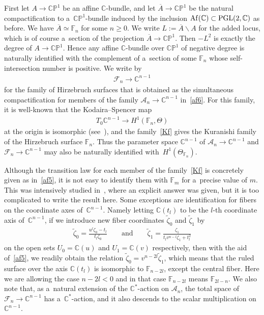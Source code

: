 First let $A\to \mathbb{CP}^1$ be an af\/f\/ine $\mathbb{C}$-bundle, and let $\overline A\to \mathbb{CP}^1$ be the
natural compactif\/ication to a~$\mathbb{CP}^1$-bundle induced by the inclusion ${\rm Af}(\mathbb{C})\subset
\mathrm{PGL}(2,\mathbb{C})$ as before.
We have $\overline A\simeq \mathbb{F}_n$ for some $n\ge 0$.
We write $L:= \overline A\backslash A$ for the added locus, which is of course a~section of the projection $\overline A\to \mathbb{CP}^1$.
Then $-L^2$ is exactly the degree of $A\to \mathbb{CP}^1$.
Hence any af\/f\/ine $\mathbb{C}$-bundle over $\mathbb{CP}^1$ of negative degree is naturally identif\/ied with the
complement of a~section of some $\mathbb{F}_n$ whose self-intersection number is positive.
We write by
\begin{gather}
\label{Kf}
\mathscr F_n\to \mathbb{C}^{n-1}
\end{gather}
for the family of Hirzebruch surfaces that is obtained as the simultaneous compactif\/ication for members of the family
$\mathscr A_n\to \mathbb{C}^{n-1}$ in~\eqref{af6}.
For this family, it is well-known that the Kodaira--Spencer map
\begin{gather}
\label{ks001}
T_0\mathbb{C}^{n-1}\to H^1(\mathbb{F}_n,\Theta)
\end{gather}
at the origin is isomorphic (see~\cite[pp.~309--312]{K}), and the family~\eqref{Kf} gives the Kuranishi family of the
Hirzebruch surface $\mathbb{F}_n$.
Thus the parameter space $\mathbb{C}^{n-1}$ of $\mathscr A_n\to\mathbb{C}^{n-1}$ and $\mathscr F_n\to\mathbb{C}^{n-1}$
may also be naturally identif\/ied with~$H^1(\Theta_{\mathbb{F}_n})$.

Although the transition law for each member of the family~\eqref{Kf} is concretely given as in~\eqref{af5}, it is not
easy to identify them with $\mathbb{F}_m$ for a~precise value of $m$.
This was intensively studied in~\cite[p.~143, Theorem]{Suwa}, where an explicit answer was given, but it is too
complicated to write the result here.
Some exceptions are identif\/ication for f\/ibers on the coordinate axes of~$\mathbb{C}^{n-1}$.
Namely letting $\mathbb{C}(t_l)$ to be the $l$-th coordinate axis of~$\mathbb{C}^{n-1}$, if we introduce new f\/iber
coordinates $\tilde{\zeta}_0$ and $\tilde{\zeta}_1$ by
\begin{gather}
\label{zeta'}
\tilde{\zeta}_0 = \frac{u^l\zeta_0-t_l}{t_l\zeta_0}
\qquad
\text{and}
\qquad
\tilde{\zeta}_1= \frac{\zeta_1}{t_lv^{n-l}\zeta_1 + t_l^2}
\end{gather}
on the open sets $U_0=\mathbb{C}(u)$ and $U_1=\mathbb{C}(v)$ respectively, then with the aid of~\eqref{af5}, we readily
obtain the relation $\tilde{\zeta}_0 = v^{n-2l}\tilde{\zeta}_1$, which means that the ruled surface over the axis
$\mathbb{C}(t_l)$ is isomorphic to $\mathbb{F}_{n-2l}$, except the central f\/iber.
Here we are allowing the case $n-2l<0$ and in that case $\mathbb{F}_{n-2l}$ means $\mathbb{F}_{2l-n}$.
We also note that, as a~natural extension of the $\mathbb{C}^*$-action on $\mathscr A_n$, the total space of $\mathscr
F_n\to\mathbb{C}^{n-1}$ has a~$\mathbb{C}^*$-action, and it also descends to the scalar multiplication on $\mathbb{C}^{n-1}$.


